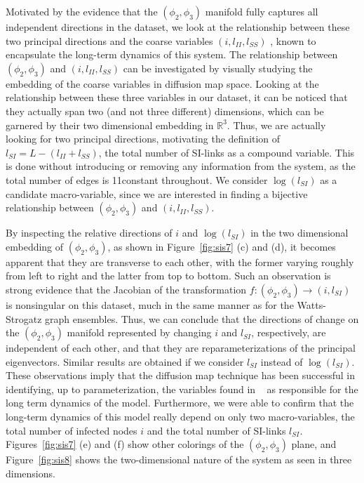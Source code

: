 Motivated by the evidence that the $(\phi_2 ,\phi_3)$ manifold fully
captures all independent directions in the dataset, we look at the
relationship between these two principal directions and the coarse
variables $(i, l_{II}, l_{SS})$ , known to encapsulate the long-term
dynamics of this system. The relationship between $(\phi_2 ,\phi_3)$
and $(i, l_{II}, l_{SS})$ can be investigated by visually studying the
embedding of the coarse variables in diffusion map space. Looking at
the relationship between these three variables in our dataset, it can
be noticed that they actually span two (and not three different)
dimensions, which can be garnered by their two dimensional embedding
in $\mathbb{R}^3$. Thus, we are actually looking for two principal
directions, motivating the definition of
$l_{SI} = L − (l_{II} + l_{SS})$, the total number of SI-links as a
compound variable. This is done without introducing or removing any
information from the system, as the total number of edges is
11constant throughout. We consider $\log(l_{SI})$ as a candidate
macro-variable, since we are interested in finding a bijective
relationship between $(\phi_2 ,\phi_3)$ and $(i, l_{II}, l_{SS})$.

By inspecting the relative directions of $i$ and $\log(l_{SI})$ in the
two dimensional embedding of $(\phi_2 ,\phi_3)$, as shown in
Figure~\ref{fig:sis7} (c) and (d), it becomes apparent that they are
transverse to each other, with the former varying roughly from left to
right and the latter from top to bottom. Such an observation is strong
evidence that the Jacobian of the transformation
$f:(\phi_2, \phi_3) \rightarrow (i, l_{SI})$ is nonsingular on this
dataset, much in the same manner as for the Watts-Strogatz graph
ensembles. Thus, we can conclude that the directions of change on the
$(\phi_2 ,\phi_3)$ manifold represented by changing $i$ and $l_{SI}$,
respectively, are independent of each other, and that they are
reparameterizations of the principal eigenvectors. Similar results are
obtained if we consider $l_{SI}$ instead of $\log(l_{SI})$. These
observations imply that the diffusion map technique has been
successful in identifying, up to parameterization, the variables found
in ~\cite{gross_robust_2008} as responsible for the long term dynamics
of the model. Furthermore, we were able to confirm that the long-term
dynamics of this model really depend on only two macro-variables, the
total number of infected nodes $i$ and the total number of SI-links
$l_{SI}$. Figures~\ref{fig:sis7} (e) and (f) show other colorings of
the $(\phi_2 ,\phi_3)$ plane, and Figure~\ref{fig:sis8} shows the
two-dimensional nature of the system as seen in three dimensions.

